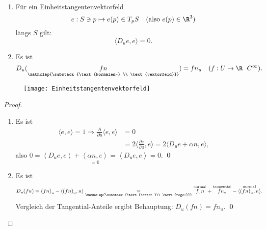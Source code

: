 \begin{lemma}
  \
  
  \begin{minipage}{.6\textwidth}
    \begin{enumerate}
      \item Für ein Einheitstangentenvektorfeld
      \begin{equation*}
        e: S \ni p \mapsto e(p) \in T_p S \quad (\text{also } e(p) \in \R^3)
      \end{equation*}
      längs \( S \) gilt:
      \begin{equation*}
        \langle D_u e, e \rangle = 0\text{.}
      \end{equation*}
  
      \item Es ist
      \begin{equation*}
        D_u(\underset{\mathclap{\substack{\text{Normalen-} \\ \text{vektorfeld}}}}{fn}) = fn_u \quad (f: U \to \R \ \ C^\infty)\text{.}
      \end{equation*}
    \end{enumerate}
  \end{minipage}
  \hfill
  \begin{minipage}{.375\textwidth}
    \begin{figure}[H]
      \texttt{[image: Einheitstangentenvektorfeld]}
    \end{figure}
  \end{minipage}
  \begin{proof}
    \ 
    \begin{enumerate}
      \item Es ist
      \begin{align*}
        \langle e, e \rangle = 1 \Rightarrow \frac{\partial}{\partial u}\langle e, e \rangle &= 0 \\
          &= 2\langle \frac{\partial e}{\partial u}, e \rangle = 2\langle D_u e + \alpha n, e \rangle\text{,}
      \end{align*}
      also \( 0 = \left\langle D_u e,e \right\rangle + \underset{=0}{\left\langle \alpha n, e \right\rangle} = \left\langle D_u e,e \right\rangle = 0 \). \qed{}

      \item Es ist
      \begin{equation*}
        D_u(fn) = {(fn)}_u - \left\langle {(fn)}_u, n \right\rangle \underset{\mathclap{\substack{\text{Ketten-}\\ \text{regel}}}}{=} \overset{\text{normal}}{f_u n} + \overset{\text{tangential}}{fn_u} - \overset{\text{normal}}{\left\langle {(fn)}_u, n \right\rangle}\text{.}
      \end{equation*}
      Vergleich der Tangential-Anteile ergibt Behauptung: \( D_u(fn) = fn_u \). \qed{}
    \end{enumerate}
  \end{proof}
\end{lemma}

